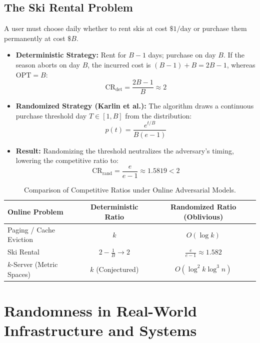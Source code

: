 \documentclass[11pt,a4paper]{article}
\begin{document}
\subsection{The Ski Rental Problem}
A user must choose daily whether to rent skis at cost $\$1/\text{day}$ or purchase them permanently at cost $\$B$.
\begin{itemize}
    \item \textbf{Deterministic Strategy:} Rent for $B-1$ days; purchase on day $B$. If the season aborts on day $B$, the incurred cost is $(B-1) + B = 2B - 1$, whereas $\text{OPT} = B$:
    \begin{equation}
    \text{CR}_{\text{det}} = \frac{2B - 1}{B} \approx 2
    \end{equation}
    \item \textbf{Randomized Strategy (Karlin et al.):} The algorithm draws a continuous purchase threshold day $T \in [1, B]$ from the distribution:
    \begin{equation}
    p(t) = \frac{e^{t/B}}{B(e - 1)}
    \end{equation}
    \item \textbf{Result:} Randomizing the threshold neutralizes the adversary's timing, lowering the competitive ratio to:
    \begin{equation}
    \text{CR}_{\text{rand}} = \frac{e}{e - 1} \approx 1.5819 < 2
    \end{equation}
\end{itemize}

\begin{table}[h!]
\centering
\small
\begin{tabular}{@{}lcc@{}}
\toprule
\textbf{Online Problem} & \textbf{Deterministic Ratio} & \textbf{Randomized Ratio (Oblivious)} \\ \midrule
Paging / Cache Eviction & $k$ & $O(\log k)$ \\
Ski Rental & $2 - \frac{1}{B} \to 2$ & $\frac{e}{e-1} \approx 1.582$ \\
$k$-Server (Metric Spaces) & $k$ (Conjectured) & $O(\log^2 k \log^3 n)$ \\
\bottomrule
\end{tabular}
\caption{Comparison of Competitive Ratios under Online Adversarial Models.}
\end{table}

\section{Randomness in Real-World Infrastructure and Systems}
\end{document}
